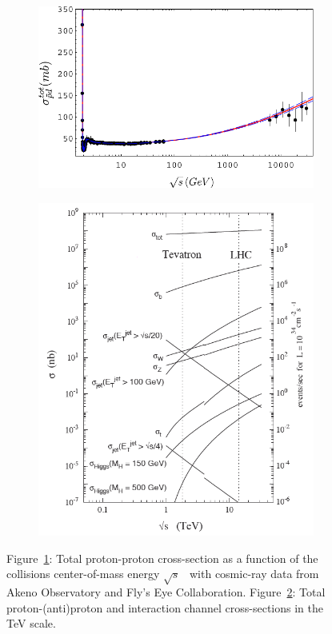	\begin{figure}[H]
		\begin{subfigure}{0.4\linewidth}
			\centering
			\includegraphics[width=0.55\plotwidth]{fig/chapt2/pp-total-cross-section.pdf}
			\caption{\label{fig:pp-cross-section:A}}
		\end{subfigure}
		\begin{subfigure}{0.6\linewidth}
			\centering
			\includegraphics[width=0.65\plotwidth]{fig/chapt2/Cross-sections.png}
			\caption{\label{fig:pp-cross-section:B}}
		\end{subfigure}
		\caption{\label{fig:pp-cross-section} Figure~\ref{fig:pp-cross-section:A}: Total proton-proton cross-section as a function of the collisions center-of-mass energy $\sqrt{s}$~\cite{ARKHIPOV2001} with cosmic-ray data from Akeno Observatory and Fly’s Eye Collaboration. Figure~\ref{fig:pp-cross-section:B}: Total proton-(anti)proton and interaction channel cross-sections in the \si{TeV} scale.}
	\end{figure}
	
